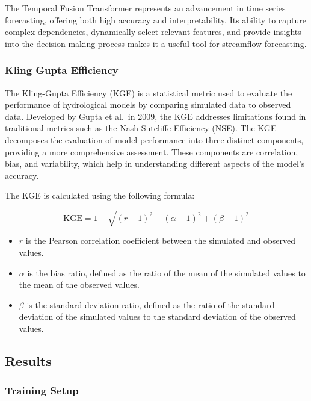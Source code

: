 \documentclass[
]{article}
\begin{document}
The Temporal Fusion Transformer represents an advancement in time series
forecasting, offering both high accuracy and interpretability. Its
ability to capture complex dependencies, dynamically select relevant
features, and provide insights into the decision-making process makes it
a useful tool for streamflow forecasting.

\hypertarget{kling-gupta-efficiency}{%
\subsubsection{Kling Gupta Efficiency}\label{kling-gupta-efficiency}}

The Kling-Gupta Efficiency (KGE) is a statistical metric used to
evaluate the performance of hydrological models by comparing simulated
data to observed data. Developed by Gupta et al.~in 2009, the KGE
addresses limitations found in traditional metrics such as the
Nash-Sutcliffe Efficiency (NSE). The KGE decomposes the evaluation of
model performance into three distinct components, providing a more
comprehensive assessment. These components are correlation, bias, and
variability, which help in understanding different aspects of the
model's accuracy.

The KGE is calculated using the following formula:

\[ \text{KGE} = 1 - \sqrt{(r - 1)^2 + (\alpha - 1)^2 + (\beta - 1)^2} \tag{2} \]

\begin{itemize}
\item
  \(r\) is the Pearson correlation coefficient between the simulated and
  observed values.
\item
  \(\alpha\) is the bias ratio, defined as the ratio of the mean of the
  simulated values to the mean of the observed values.
\item
  \(\beta\) is the standard deviation ratio, defined as the ratio of the
  standard deviation of the simulated values to the standard deviation
  of the observed values.
\end{itemize}

\hypertarget{results}{%
\subsection{Results}\label{results}}

\hypertarget{training-setup}{%
\subsubsection{Training Setup}\label{training-setup}}
\end{document}
